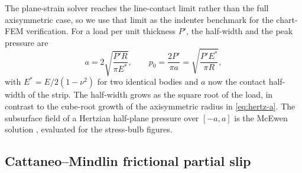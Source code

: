 \documentclass{svjour3}                 %
\begin{document}
\begin{appendix}
The plane-strain solver reaches the line-contact limit rather than the full axisymmetric
case, so we use that limit as the indenter benchmark for the chart-FEM verification. For a
load per unit thickness $P'$, the half-width and the peak pressure are
\begin{equation}\label{eq:line-contact}
  a = 2\sqrt{\frac{P'R}{\pi E^\ast}}, \qquad
  p_0 = \frac{2P'}{\pi a} = \sqrt{\frac{P'E^\ast}{\pi R}},
\end{equation}
with $E^\ast = E/2(1-\nu^2)$ for two identical bodies and $a$ now the contact half-width
of the strip. The half-width grows as the square root of the load, in contrast to the
cube-root growth of the axisymmetric radius in \eqref{eq:hertz-a}. The subsurface field of
a Hertzian half-plane pressure over $[-a,a]$ is the McEwen solution
\citep[Eq.~4.49]{johnson1985contact}, evaluated for the stress-bulb figures.

\subsection{Cattaneo--Mindlin frictional partial slip}\label{app:cattaneo}


\end{appendix}
\end{document}
